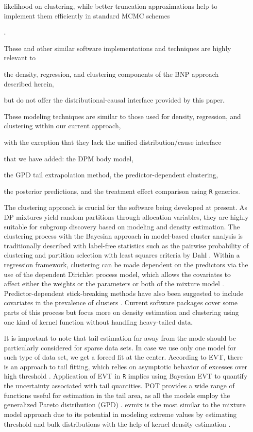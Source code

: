 \documentclass[11pt]{article}\usepackage[]{graphicx}\usepackage[]{xcolor}
\newcommand{\pkg}[1]{\textsf{#1}}
\newcommand{\proglang}[1]{\texttt{#1}}
\begin{document}
likelihood on clustering, while better truncation approximations help to implement them efficiently in standard MCMC schemes

\citep{Wade2014EDP,BurnsDaniels2023EDPM}.

These and other similar software implementations and techniques are highly relevant to

the density, regression, and clustering components of the BNP approach described herein,

but do not offer the distributional-causal interface provided by this paper.

These modeling techniques are similar to those used for density, regression, and clustering within our current approach,

with the exception that they lack the unified distribution/cause interface

that we have added: the DPM body model,

the GPD tail extrapolation method, the predictor-dependent clustering,

the posterior predictions, and the treatment effect comparison using \proglang{R} generics.

The clustering approach is crucial for the software being developed at present.
As DP mixtures yield random partitions through allocation variables,
they are highly suitable for subgroup discovery based on modeling
and density estimation. The clustering process with the Bayesian
approach in model-based cluster analysis is traditionally described
with label-free statistics such as the pairwise probability of
clustering \citep{Binder1978} and partition selection with least
squares criteria by Dahl \citep{Dahl2006}. Within a regression
framework, clustering can be made dependent on the predictors via
the use of the dependent Dirichlet process model, which allows the
covariates to affect either the weights or the parameters or both
of the mixture model \citep{MacEachern1999, MacEachern2000, DeIorio2004, Quintana2022}.
Predictor-dependent stick-breaking methods have also been suggested
to include covariates in the prevalence of clusters
\citep{Ren2011}. Current software packages cover some parts of this
process but focus more on density estimation and clustering using
one kind of kernel function without handling heavy-tailed data.

It is important to note that tail estimation far away from the mode should be particularly considered for sparse data sets. In case we use only one model for such type of data set, we get a forced fit at the center. According to EVT, there is an approach to tail fitting, which relies on asymptotic behavior of excesses over high threshold
\citep{BalkemaDeHaan1974,Pickands1975,Coles2001}. Application of EVT in \proglang{R} implies using Bayesian EVT to quantify the uncertainty associated with tail quantities. \pkg{POT} provides a wide range of functions useful for estimation in the tail area, as all the models employ the generalized Pareto distribution (GPD)
\citep{POT_pkg}. \pkg{evmix} is the most similar to the mixture model approach due to its potential in modeling extreme values by estimating threshold and bulk distributions with the help of kernel density estimation \citep{evmix_pkg}.
\end{document}
